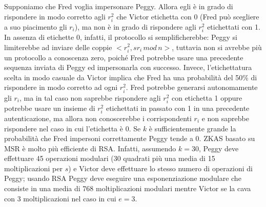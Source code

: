 Supponiamo che Fred voglia impersonare Peggy. Allora egli è in grado di rispondere in modo corretto agli $r_{i}^2$ che Victor etichetta con 0 (Fred può scegliere a suo piacimento gli $r_{i}$), ma non è in grado di rispondere agli $r_{i}^2$ etichettati con 1. In assenza di etichette 0, infatti, il protocollo si semplificherebbe: Peggy si limiterebbe ad inviare delle coppie $<r_{i}^2, sr_{i} \, mod \, n>$, tuttavia non si avrebbe più un protocollo a conoscenza zero, poiché Fred potrebbe usare una precedente sequenza inviata di Peggy ed impersonarla con successo. Invece, l'etichettatura scelta in modo casuale da Victor implica che Fred ha una probabilità del 50\% di rispondere in modo corretto ad ogni $r_{i}^2$. Fred potrebbe generarsi autonomamente gli $r_{i}$, ma in tal caso non saprebbe rispondere agli $r_{i}^2$ con etichetta 1 oppure potrebbe usare un insieme di $r_{i}^2$ etichettati in passato con 1 in una precedente autenticazione, ma allora non conoscerebbe i corrispondenti $r_{i}$ e non saprebbe rispondere nel caso in cui l'etichetta è 0. Se $k$ è sufficientemente grande la probabilità che Fred impersoni correttamente Peggy tende a 0. 
\newline \newline
ZKAS basato su MSR è molto più efficiente di RSA. Infatti, assumendo $k = 30$, Peggy deve effettuare 45 operazioni modulari (30 quadrati più una media di 15 moltiplicazioni per $s$) e Victor deve effettuare lo stesso numero di operazioni di Peggy; usando RSA Peggy deve eseguire una esponenziazione modulare che consiste in una media di 768 moltiplicazioni modulari mentre Victor se la cava con 3 moltiplicazioni nel caso in cui $e = 3$.

